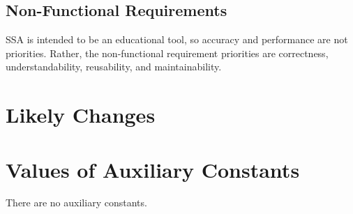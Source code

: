 \documentclass[12pt]{article}
\begin{document}
\subsection{Non-Functional Requirements}
\label{Sec:NFRs}
SSA is intended to be an educational tool, so accuracy and performance are not priorities. Rather, the non-functional requirement priorities are correctness, understandability, reusability, and maintainability.
\section{Likely Changes}
\label{Sec:LCs}
\section{Values of Auxiliary Constants}
\label{Sec:AuxConstants}
There are no auxiliary constants.
\end{document}
